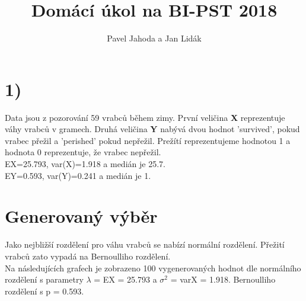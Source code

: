 \documentclass[12pt,a4paper]{article}
\begin{document}
\title{\LARGE \bf Domácí úkol na BI-PST 2018}
 \author{Pavel Jahoda a Jan Lidák}

\maketitle

\section{1)}
Data jsou z pozorování 59 vrabců během zimy. První veličina {\bf X} reprezentuje váhy vrabců v gramech. Druhá veličina {\bf Y} nabývá dvou hodnot 'survived', pokud vrabec přežil a 'perished' pokud nepřežil. Prežítí reprezentujeme hodnotou 1 a hodnota 0 reprezentuje, že vrabec nepřežil.\\
EX=25.793, var(X)=1.918 a medián je 25.7.\\
EY=0.593, var(Y)=0.241 a medián je 1.\\
\par \bigskip

\section{Generovaný výběr}
Jako nejbližší rozdělení pro váhu vrabců se nabízí normální rozdělení. Přežití vrabců zato vypadá na Bernoulliho rozdělení.\\
Na následujících grafech je zobrazeno 100 vygenerovaných hodnot dle normálního rozdělení s parametry $\lambda$ = EX = 25.793 a $\sigma ^2$ = varX = 1.918. Bernoulliho rozdělení s p = 0.593.
\end{document}
